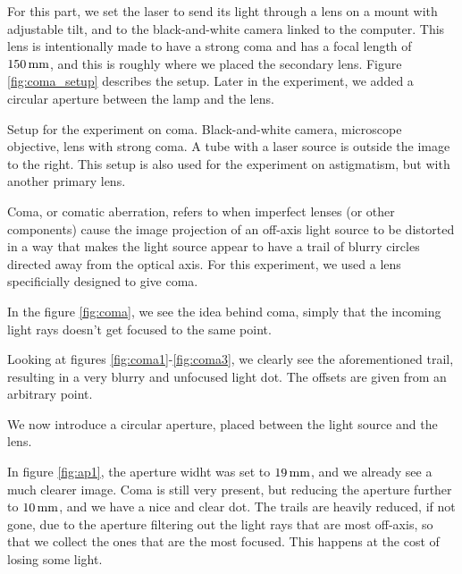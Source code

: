 
For this part, we set the laser to send its light through
a lens on a mount with adjustable tilt, and to the black-and-white camera
linked to the computer. This lens is intentionally made to have a strong coma
and has a focal length of $150 \, \textrm{mm}$, and this is roughly where we placed the
secondary lens. Figure \vref{fig:coma_setup} describes the setup. Later in the
experiment, we added a circular aperture between the lamp and the lens.

    {Setup for the experiment on coma. Black-and-white camera, microscope
    objective, lens with strong coma. A tube with a laser source is outside the
    image to the right. This setup is also used for the experiment on
    astigmatism, but with another primary lens.}

Coma, or comatic aberration, refers to when imperfect lenses 
(or other components) cause the image projection of an off-axis 
light source to be distorted in a way that makes the light source
appear to have a trail of blurry circles directed away from the 
optical axis. For this experiment, we used a lens specificially 
designed to give coma. 

In the figure \vref{fig:coma}, we see the idea behind coma, 
simply that the incoming light rays doesn't get focused to the same point.



Looking at figures \vref{fig:coma1}-\vref{fig:coma3}, we clearly see
the aforementioned trail, resulting in a very blurry and unfocused light dot.
The offsets are given from an arbitrary point.

We now introduce a circular aperture, placed between the light source and the
lens.

In figure \vref{fig:ap1}, the aperture widht was set to $19 \, \textrm{mm}$, and we
already see a much clearer image. Coma is still very present, but reducing the
aperture further to $10 \, \textrm{mm}$, and we have a nice and clear dot. The trails
are heavily reduced, if not gone, due to the aperture filtering out the
light rays that are most off-axis, so that we collect the ones that are the
most focused. This happens at the cost of losing some light.

